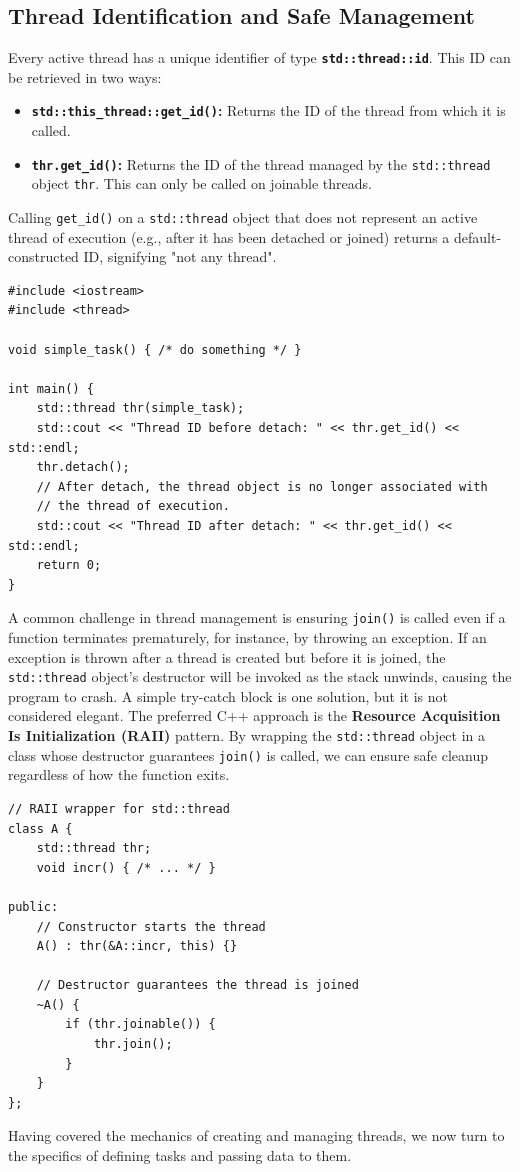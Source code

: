 \documentclass{article} %
\begin{document}
\subsection{Thread Identification and Safe Management}
Every active thread has a unique identifier of type \textbf{\texttt{std::thread::id}}. This ID can be retrieved in two ways:
\begin{itemize}
    \item \textbf{\texttt{std::this\_thread::get\_id()}:} Returns the ID of the thread from which it is called.
    \item \textbf{\texttt{thr.get\_id()}:} Returns the ID of the thread managed by the \texttt{std::thread} object \texttt{thr}. This can only be called on joinable threads.
\end{itemize}
Calling \texttt{get\_id()} on a \texttt{std::thread} object that does not represent an active thread of execution (e.g., after it has been detached or joined) returns a default-constructed ID, signifying "not any thread".
\begin{verbatim}
#include <iostream>
#include <thread>

void simple_task() { /* do something */ }

int main() {
    std::thread thr(simple_task);
    std::cout << "Thread ID before detach: " << thr.get_id() << std::endl;
    thr.detach();
    // After detach, the thread object is no longer associated with 
    // the thread of execution.
    std::cout << "Thread ID after detach: " << thr.get_id() << std::endl;
    return 0;
}
\end{verbatim}
A common challenge in thread management is ensuring \texttt{join()} is called even if a function terminates prematurely, for instance, by throwing an exception. If an exception is thrown after a thread is created but before it is joined, the \texttt{std::thread} object's destructor will be invoked as the stack unwinds, causing the program to crash.
A simple try-catch block is one solution, but it is not considered elegant. The preferred C++ approach is the \textbf{Resource Acquisition Is Initialization (RAII)} pattern. By wrapping the \texttt{std::thread} object in a class whose destructor guarantees \texttt{join()} is called, we can ensure safe cleanup regardless of how the function exits.
\begin{verbatim}
// RAII wrapper for std::thread
class A {
    std::thread thr;
    void incr() { /* ... */ }

public:
    // Constructor starts the thread
    A() : thr(&A::incr, this) {}

    // Destructor guarantees the thread is joined
    ~A() {
        if (thr.joinable()) {
            thr.join();
        }
    }
};
\end{verbatim}
Having covered the mechanics of creating and managing threads, we now turn to the specifics of defining tasks and passing data to them.
\end{document}
